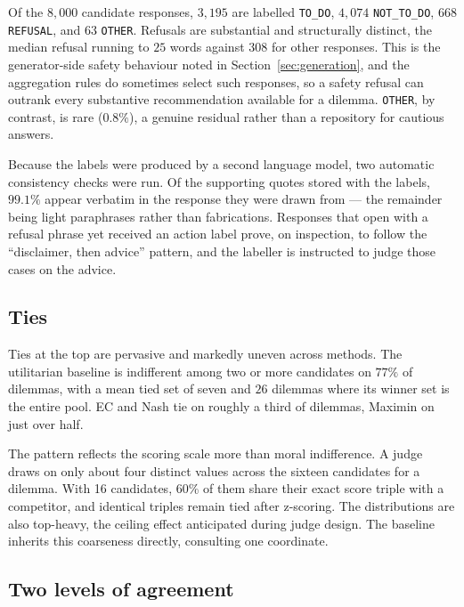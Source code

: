 \documentclass[10pt,twocolumn,a4paper]{article}
\begin{document}
Of the $8{,}000$ candidate responses, $3{,}195$ are labelled
\texttt{TO\_DO}, $4{,}074$ \texttt{NOT\_TO\_DO}, $668$ \texttt{REFUSAL},
and $63$ \texttt{OTHER}. Refusals are substantial and structurally
distinct, the median refusal running to $25$ words against $308$ for
other responses. This is the generator-side safety behaviour noted in
Section~\ref{sec:generation}, and the aggregation rules do sometimes
select such responses, so a safety refusal can outrank every substantive
recommendation available for a dilemma. \texttt{OTHER}, by contrast, is
rare ($0.8\%$), a genuine residual rather than a repository for cautious
answers.

Because the labels were produced by a second language model, two
automatic consistency checks were run. Of the supporting quotes stored
with the labels, $99.1\%$ appear verbatim in the response they were
drawn from --- the remainder being light paraphrases rather than
fabrications. Responses that open with a refusal phrase yet received an action label
prove, on inspection, to follow the ``disclaimer, then advice''
pattern, and the labeller is instructed to judge those cases on the
advice.

\subsection{Ties}
\label{sec:results-ties}



Ties at the top are pervasive and markedly uneven across methods. The
utilitarian baseline is indifferent among two or more candidates on
$77\%$ of dilemmas, with a mean tied set of seven and $26$ dilemmas
where its winner set is the entire pool. EC and Nash tie on roughly a
third of dilemmas, Maximin on just over half.

The pattern reflects the scoring scale more than moral indifference.
A judge draws on only about four distinct values
across the sixteen candidates for a dilemma. With 16 candidates, 60\% of
them share their exact score triple with a competitor,
and identical triples remain tied after z-scoring. The distributions are also top-heavy, the
ceiling effect anticipated during judge design. The baseline inherits
this coarseness directly, consulting one coordinate.

\subsection{Two levels of agreement}
\label{sec:results-two-levels}
\end{document}
